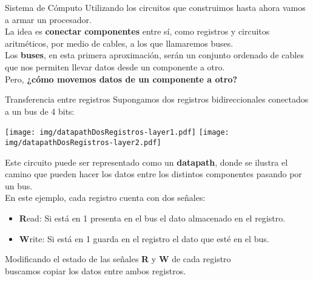 \documentclass[aspectratio=169]{beamer}
\begin{document}
\begin{frame}[fragile]{Sistema de Cómputo}
    Utilizando los circuitos que construimos hasta ahora vamos a armar un procesador.\\
    \bigskip
    La idea es \textbf{conectar componentes} entre sí, como registros y circuitos aritméticos, por medio de cables, a los que llamaremos buses.\\
    \bigskip
    Los \textbf{buses}, en esta primera aproximación, serán un conjunto ordenado de cables que nos permiten llevar datos desde un componente a otro.\\
    \bigskip
    Pero, \textbf{\textcolor{naranjauca}{¿cómo movemos datos de un componente a otro?}}
\end{frame}

\begin{frame}[fragile,t]{Transferencia entre registros}
    Supongamos dos registros bidireccionales conectados a un bus de 4 bits:\\
    \begin{center}
    \texttt{[image: img/datapathDosRegistros-layer1.pdf]} \hspace{1cm}
    \pause
    \texttt{[image: img/datapathDosRegistros-layer2.pdf]}
    \end{center}
    Este circuito puede ser representado como un \textbf{datapath}, donde se ilustra el camino que pueden hacer los datos entre los distintos componentes pasando por un bus.\\
    \bigskip
    \pause
    En este ejemplo, cada registro cuenta con dos señales:\\
    \begin{itemize}
    \setlength\itemsep{0cm}
    \item \normalsize \textbf{R}ead: {\small Si está en 1 presenta en el bus el dato almacenado en el registro.}\\
    \item \normalsize \textbf{W}rite: {\small Si está en 1 guarda en el registro el dato que esté en el bus.}\\
    \end{itemize}
    \begin{center}
    \textcolor{verdeuca}{Modificando el estado de las señales \textbf{R} y \textbf{W} de cada registro\\ buscamos copiar los datos entre ambos registros.}
    \end{center}
\end{frame}
\end{document}
